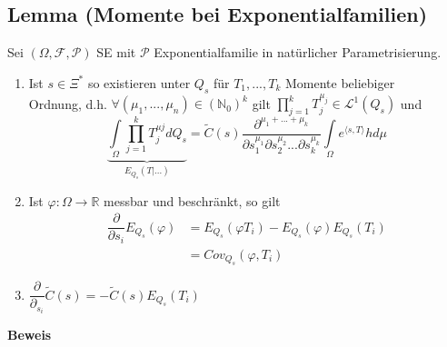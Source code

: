 \documentclass[german,10pt,oneside, fleqn, a4paper]{article}
\newcommand {\R}	{\mathbb{R}}
\newcommand {\N}	{\mathbb{N}}
\newcommand{\ra}{\rightarrow}
\newcommand{\brc}[1]{\left(#1\right)}
\newcommand{\mc}[1]{\mathcal{#1}}
\newcommand{\lp}[1]{\mc{L}^{#1}}
\newcommand{\beweis}{\textbf{Beweis}\\}
\newcommand{\1}[1]{1_{#1}}
\newcommand{\2}[1]{\1{\brac{#1}}}
\newcommand{\rraum}{\brc{\Omega,\mc{F},\mc{P}}}
\begin{document}
\subsection{Lemma (Momente bei Exponentialfamilien)}
\label{11.11}

Sei $\rraum$ SE mit $\mc{P}$ Exponentialfamilie in natürlicher Parametrisierung.
\begin{enumerate}[label=(\alph*)]
\item Ist $s\in\Xi^*$ so existieren unter $Q_s$ für $T_1,...,T_k$ Momente beliebiger\\
Ordnung, d.h. $\forall (\mu_1,...,\mu_n)\in(\N_0)^k$ gilt $\prod\limits_{j=1}^kT_j^{\mu_j}\in\lp{1}(Q_s)$ und
\[\underbrace{\int\limits_\Omega\prod\limits_{j=1}^kT_j^{\mu j}dQ_s}_{E_{Q_s}(T|...)}=\tilde{C}(s)\dfrac{\partial^{\mu_1+...+\mu_k}}{{\partial s_1^{\mu_1}\partial s_2^{\mu_2}...\partial s_k^{\mu_k}}}\int\limits_\Omega e^{\langle s,T\rangle}hd\mu\]
\item Ist $\varphi:\Omega\ra\R$ messbar und beschränkt, so gilt \begin{align}
\dfrac{\partial}{\partial s_i}E_{Q_s}(\varphi) & = E_{Q_s}(\varphi T_i)-E_{Q_s}(\varphi) E_{Q_s}(T_i)\\
& = Cov_{Q_s}(\varphi,T_i)
\end{align} 
\item $\dfrac{\partial}{\partial_{s_i}}\tilde{C}(s)=-\tilde{C}(s)E_{Q_s}(T_i)$
\end{enumerate}
\beweis
{}
\end{document}
